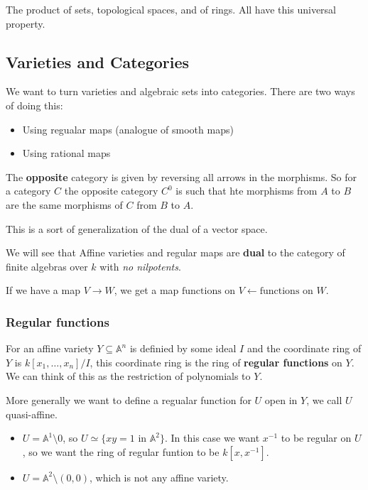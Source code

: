 \begin{exercise}
    The product of sets, topological spaces, and of rings. All have this universal property.
\end{exercise}

\subsection{Varieties and Categories}
We want to turn varieties and algebraic sets into categories. There are two ways of doing this:\begin{itemize}
    \item Using regualar maps (analogue of smooth maps)
    \item Using rational maps
\end{itemize}

\begin{definition}
    The \textbf{opposite} category is given by reversing all arrows in the morphisms. So for a category $C$ the opposite category $C^0$ is such that hte morphisms from $A$ to $B$ are the same morphisms of $C$ from $B$ to $A$.

This is a sort of generalization of the dual of a vector space.
\end{definition}

\begin{proposition}
We will see that Affine varieties and regular maps are \textbf{dual} to the category of finite algebras over $k$ with \textit{no nilpotents}.

If we have a map $V\rightarrow W$, we get a map $\text{functions on }V\leftarrow \text{functions on }W$. 
\end{proposition}

\subsubsection{Regular functions}
\begin{definition}
    For an affine variety $Y\subseteq \mathbb{A}^n$ is definied by some ideal $I$ and the coordinate ring of $Y$ is $k[x_1,\dots,x_n]/I$, this coordinate ring is the ring of \textbf{regular functions} on $Y$. We can think of this as the restriction of polynomials to $Y$.   
\end{definition}

More generally we want to define a regualar function for $U$ open in $Y$, we call $U$ quasi-affine. 

\begin{example}
\begin{itemize}
    \item $U = \mathbb{A}^1\setminus 0$, so $U\simeq \{xy = 1 \text{ in }\mathbb{A}^2 \}$. In this case we want $x^{-1}$ to be regular on $U$, so we want the ring of regular funtion to be $k[x,x^{-1}]$. 
    \item $U = \mathbb{A}^2\setminus (0,0)$, which is not any affine variety. 
\end{itemize}    
\end{example}

